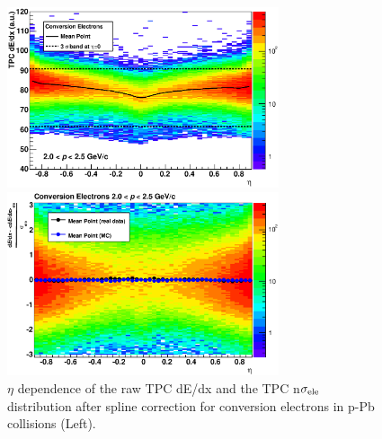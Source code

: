 {\begin{figure}[htbp]
 \begin{minipage}{0.5\hsize}
  \begin{center}
  \includegraphics[width=8cm]{chap4/figure/PID/RawTPCdEdxforConv_MB.eps}
  \end{center}
 \end{minipage}
 \begin{minipage}{0.5\hsize}
  \begin{center}
  \includegraphics[width=8cm]{chap4/figure/PID/TPCNSigmaforConv_MB.eps}
  \end{center}
 \end{minipage}
  \caption{$\eta$ dependence of the raw TPC dE/dx and the TPC n$\sigma_{\rm{ele}}$ distribution after spline correction for conversion electrons in p-Pb collisions (Left).}
  \label{fig_4_tpcdedxforconv}
\end{figure}

}
